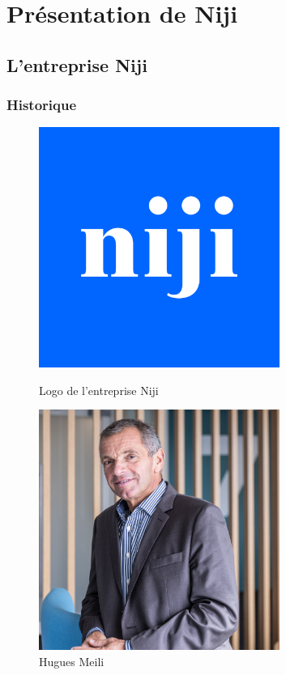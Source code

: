 \documentclass[12pt]{article}
\begin{document}
\newpage
\section{Présentation de Niji}
\subsection{L'entreprise Niji}
\subsubsection{Historique}
\begin{figure}[h!]
    \centering
    \begin{minipage}{0.4\textwidth}
        \centering
        \includegraphics[width=0.7\textwidth]{img/logo-niji.png} 
        \caption{Logo de l'entreprise Niji}
    \end{minipage}
    \hspace{0.05\textwidth}
    \begin{minipage}{0.4\textwidth}
        \centering
        \includegraphics[width=0.7\textwidth]{img/hugues-meili.jpg}
        \caption{Hugues Meili}
    \end{minipage}
\end{figure}
\end{document}
